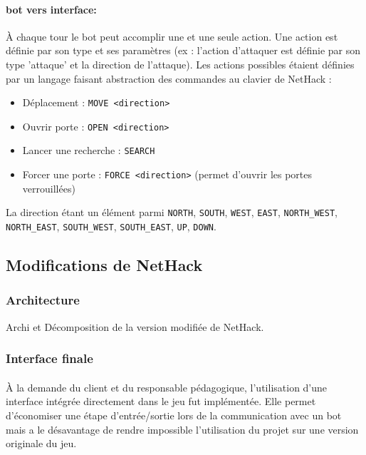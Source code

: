 \documentclass[a4paper,12pt]{article}
\begin{document}
\paragraph{bot vers interface:} À chaque tour le bot peut accomplir une et une seule action. Une action est définie par son type et ses paramètres (ex : l'action d'attaquer est définie par son type 'attaque' et la direction de l'attaque). Les actions possibles étaient définies par un langage faisant abstraction des commandes au clavier de NetHack :
\begin{itemize}
	\item Déplacement : \verb!MOVE <direction>!
	\item Ouvrir porte : \verb!OPEN <direction>!
	\item Lancer une recherche : \verb!SEARCH!
	\item Forcer une porte : \verb!FORCE <direction>! (permet d'ouvrir les portes verrouillées)
\end{itemize}
\noindent La direction étant un élément parmi \verb!NORTH!, \verb!SOUTH!, \verb!WEST!, \verb!EAST!, \verb!NORTH_WEST!, \verb!NORTH_EAST!, \verb!SOUTH_WEST!, \verb!SOUTH_EAST!, \verb!UP!, \verb!DOWN!.


\subsection{Modifications de NetHack}

\subsubsection{Architecture}

Archi et Décomposition de la version modifiée de NetHack.

\subsubsection{Interface finale}

\paragraph{}À la demande du client et du responsable pédagogique, l'utilisation d'une interface intégrée directement dans le jeu fut implémentée. Elle permet d'économiser une étape d'entrée/sortie lors de la communication avec un bot mais a le désavantage de rendre impossible l'utilisation du projet sur une version originale du jeu.
\end{document}
